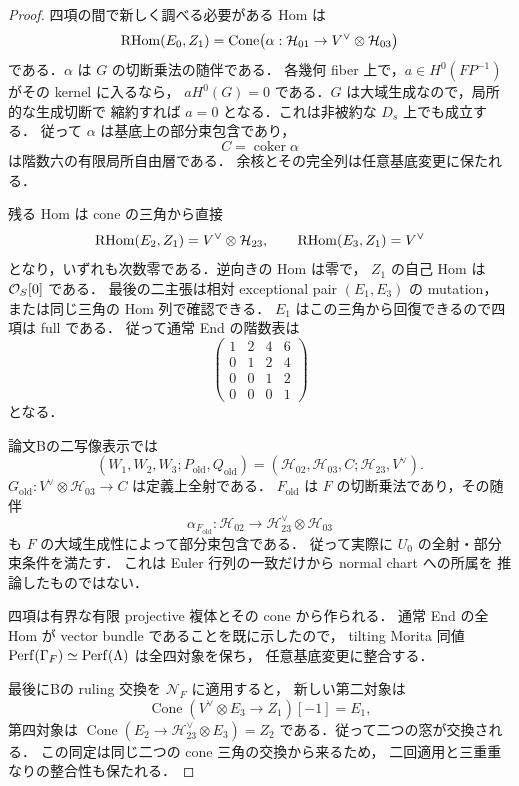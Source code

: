 \begin{proof}
四項の間で新しく調べる必要がある Hom は
\[
 \operatorname{RHom}(E_0,Z_1)
 =\operatorname{Cone}\bigl(
   \alpha:\mathcal H_{01}\to V^\vee\otimes\mathcal H_{03}\bigr)
\]
である．$\alpha$ は $G$ の切断乗法の随伴である．
各幾何 fiber 上で，$a\in H^0(FP^{-1})$ がその kernel に入るなら，
$aH^0(G)=0$ である．$G$ は大域生成なので，局所的な生成切断で
縮約すれば $a=0$ となる．これは非被約な $D_s$ 上でも成立する．
従って $\alpha$ は基底上の部分束包含であり，
\[
 C=\operatorname{coker}\alpha
\]
は階数六の有限局所自由層である．
余核とその完全列は任意基底変更に保たれる．

残る Hom は cone の三角から直接
\[
 \operatorname{RHom}(E_2,Z_1)=V^\vee\otimes\mathcal H_{23},\qquad
 \operatorname{RHom}(E_3,Z_1)=V^\vee
\]
となり，いずれも次数零である．逆向きの Hom は零で，
$Z_1$ の自己 Hom は $\mathcal O_S[0]$ である．
最後の二主張は相対 exceptional pair $(E_1,E_3)$ の mutation，
または同じ三角の Hom 列で確認できる．
$E_1$ はこの三角から回復できるので四項は full である．
従って通常 End の階数表は
\[
 \begin{pmatrix}1&2&4&6\\0&1&2&4\\0&0&1&2\\0&0&0&1\end{pmatrix}
\]
となる．

論文Bの二写像表示では
\[
 (W_1,W_2,W_3;P_{\mathrm{old}},Q_{\mathrm{old}})
 =(\mathcal H_{02},\mathcal H_{03},C;
   \mathcal H_{23},V^\vee).
\]
$G_{\mathrm{old}}:V^\vee\otimes\mathcal H_{03}\to C$ は定義上全射である．
$F_{\mathrm{old}}$ は $F$ の切断乗法であり，その随伴
\[
 \alpha_{F_{\mathrm{old}}}:
 \mathcal H_{02}\to\mathcal H_{23}^\vee\otimes\mathcal H_{03}
\]
も $F$ の大域生成性によって部分束包含である．
従って実際に $U_0$ の全射・部分束条件を満たす．
これは Euler 行列の一致だけから normal chart への所属を
推論したものではない．

四項は有界な有限 projective 複体とその cone から作られる．
通常 End の全 Hom が vector bundle であることを既に示したので，
tilting Morita 同値
$\operatorname{Perf}(\Gamma_F)\simeq\operatorname{Perf}(\Lambda)$ は全四対象を保ち，
任意基底変更に整合する．

最後にBの ruling 交換を $\mathcal N_F$ に適用すると，
新しい第二対象は
\[
 \operatorname{Cone}(V^\vee\otimes E_3\to Z_1)[-1]=E_1,
\]
第四対象は $\operatorname{Cone}(E_2\to\mathcal H_{23}^\vee\otimes E_3)=Z_2$
である．従って二つの窓が交換される．
この同定は同じ二つの cone 三角の交換から来るため，
二回適用と三重重なりの整合性も保たれる．
\end{proof}

